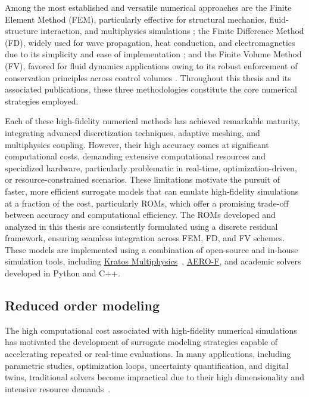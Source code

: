 Among the most established and versatile numerical approaches are the Finite Element Method (FEM), particularly effective for structural mechanics, fluid-structure interaction, and multiphysics simulations \cite{zienkiewicz2005finite,onate2009structural}; the Finite Difference Method (FD), widely used for wave propagation, heat conduction, and electromagnetics due to its simplicity and ease of implementation \cite{mitchell1980finite,taflove2005computational}; and the Finite Volume Method (FV), favored for fluid dynamics applications owing to its robust enforcement of conservation principles across control volumes \cite{versteeg2007introduction,moukalled2016finite}. Throughout this thesis and its associated publications, these three methodologies constitute the core numerical strategies employed.

Each of these high-fidelity numerical methods has achieved remarkable maturity, integrating advanced discretization techniques, adaptive meshing, and multiphysics coupling. However, their high accuracy comes at significant computational costs, demanding extensive computational resources and specialized hardware, particularly problematic in real-time, optimization-driven, or resource-constrained scenarios. These limitations motivate the pursuit of faster, more efficient surrogate models that can emulate high-fidelity simulations at a fraction of the cost, particularly ROMs, which offer a promising trade-off between accuracy and computational efficiency. The ROMs developed and analyzed in this thesis are consistently formulated using a discrete residual framework, ensuring seamless integration across FEM, FD, and FV schemes. These models are implemented using a combination of open-source and in-house simulation tools, including 
\href{https://github.com/KratosMultiphysics/Kratos}{Kratos Multiphysics}~\cite{dadvand2010object}, 
\href{https://bitbucket.org/frg/aero-f/src/master/}{AERO-F}, 
and academic solvers developed in Python and C++.



\subsection{Reduced order modeling}

The high computational cost associated with high-fidelity numerical simulations has motivated the development of surrogate modeling strategies capable of accelerating repeated or real-time evaluations. In many applications, including parametric studies, optimization loops, uncertainty quantification, and digital twins, traditional solvers become impractical due to their high dimensionality and intensive resource demands~\cite{brunton2022data, rozza2022advanced}.

